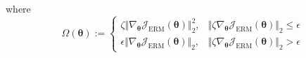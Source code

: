 \documentclass[landscape,a0paper,fontscale=0.3]{baposter}
\begin{document}
\begin{poster}
{where
\vspace{-1em}
\begin{equation*}
\Omega(\boldsymbol{\theta}):=\begin{cases}
\zeta\Vert\nabla_{\boldsymbol{\theta}}\mathcal{J}_\mathrm{ERM}(\boldsymbol{\theta})\Vert_2^2,&\!\!\!\!\Vert\zeta\nabla_{\boldsymbol{\theta}}\mathcal{J}_\mathrm{ERM}(\boldsymbol{\theta})\Vert_2\le\epsilon\\
\epsilon\Vert\nabla_{\boldsymbol{\theta}}\mathcal{J}_\mathrm{ERM}(\boldsymbol{\theta})\Vert_2,&\!\!\!\!\Vert\zeta\nabla_{\boldsymbol{\theta}}\mathcal{J}_\mathrm{ERM}(\boldsymbol{\theta})\Vert_2>\epsilon
\end{cases}
\end{equation*}
\vspace{-1.5em}
}


\end{poster}
\end{document}
